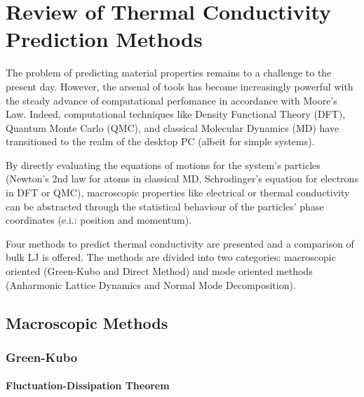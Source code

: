 \chapter{Review of Thermal Conductivity Prediction Methods}

The problem of predicting material properties remains to a challenge to the present day. However, the arsenal of tools has become increasingly powerful with the steady advance of computational perfomance in accordance with Moore's Law. Indeed, computational techniques like Density Functional Theory (DFT), Quantum Monte Carlo (QMC), and classical Molecular Dynamics (MD) have transitioned to the realm of the desktop PC (albeit for simple systems).

By directly evaluating the equations of motions for the system's particles (Newton's 2nd law for atoms in classical MD, Schrodinger's equation for electrons in DFT or QMC), macroscopic properties like electrical or thermal conductivity can be abstracted through the statistical behaviour of the particles' phase coordinates (e.i.: position and momentum).

Four methods to predict thermal conductivity are presented and a comparison of bulk LJ is offered. The methods are divided into two categories: macroscopic oriented (Green-Kubo and Direct Method) and mode oriented methods (Anharmonic Lattice Dynamics and Normal Mode Decomposition).

\section{Macroscopic Methods}
\subsection{Green-Kubo}
\subsubsection{Fluctuation-Dissipation Theorem}

